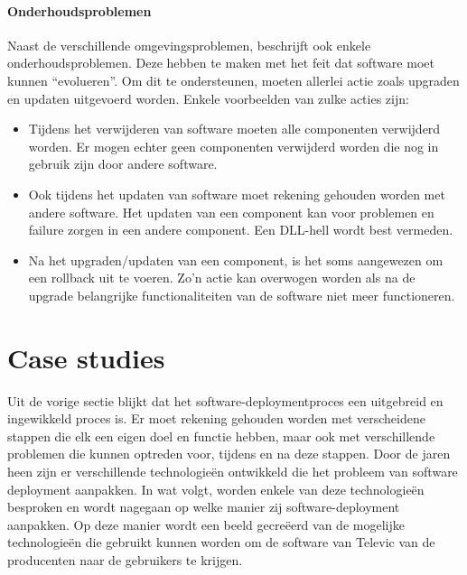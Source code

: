 \paragraph{Onderhoudsproblemen}
Naast de verschillende omgevingsproblemen, beschrijft \citet{dolstra2006purely} ook enkele onderhoudsproblemen.
Deze hebben te maken met het feit dat software moet kunnen ``evolueren''.
Om dit te ondersteunen, moeten allerlei actie zoals upgraden en updaten uitgevoerd worden.
Enkele voorbeelden van zulke acties zijn:
\begin{itemize}
\item Tijdens het verwijderen van software moeten alle componenten verwijderd worden.
Er mogen echter geen componenten verwijderd worden die nog in gebruik zijn door andere software.
\item Ook tijdens het updaten van software moet rekening gehouden worden met andere software.
Het updaten van een component kan voor problemen en failure zorgen in een andere component.
Een DLL-hell wordt best vermeden.
\item Na het upgraden/updaten van een component, is het soms aangewezen om een rollback uit te voeren.
Zo'n actie kan overwogen worden als na de upgrade belangrijke functionaliteiten van de software niet meer functioneren.
\end{itemize}

\section{Case studies}\label{sec:caseStudies}
Uit de vorige sectie blijkt dat het software-deploymentproces een uitgebreid en ingewikkeld proces is.
Er moet rekening gehouden worden met verscheidene stappen die elk een eigen doel en functie hebben, maar ook met verschillende problemen die kunnen optreden voor, tijdens en na deze stappen.
Door de jaren heen zijn er verschillende technologieën ontwikkeld die het probleem van software deployment aanpakken.
In wat volgt, worden enkele van deze technologieën besproken en wordt nagegaan op welke manier zij software-deployment aanpakken.
Op deze manier wordt een beeld gecreëerd van de mogelijke technologieën die gebruikt kunnen worden om de software van Televic van de producenten naar de gebruikers te krijgen.

